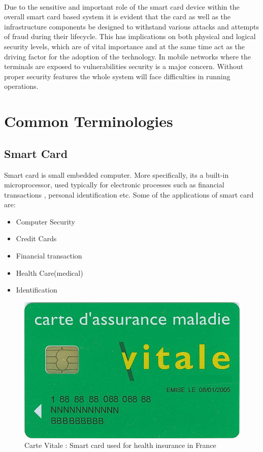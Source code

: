 \documentclass[12pt]{article}
\begin{document}
\paragraph{}
Due to the sensitive and important role of the smart
card device within the overall smart card based system
it is evident that the card as well as the infrastructure
components be designed to withstand various attacks
and attempts of fraud during their lifecycle. This has
implications on both physical and logical security
levels, which are of vital importance and at the same
time act as the driving factor for the adoption of the
technology. In mobile networks where the terminals are exposed to vulnerabilities security is a major concern. Without proper security features the whole system will face difficulties in running operations.


\section{Common Terminologies}
\subsection{Smart Card}
Smart card is  small embedded computer. More specifically, its a built-in microprocessor, used typically for electronic processes such as financial transactions , personal identification etc. Some of the applications of smart card are:
\begin{itemize}
\item Computer Security
\item Credit Cards
\item Financial transaction
\item Health Care(medical)
\item Identification

\end{itemize}

\begin{figure}[!t]

\centering
    \includegraphics[scale=0.3]{smart_card}
    \caption{Carte Vitale : Smart card used for health insurance in France}
    \label{smart_card}
\label{adhoc}

\end{figure}
\end{document}
